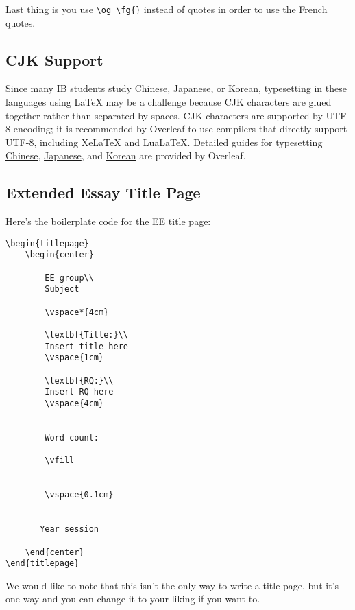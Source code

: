Last thing is you use \verb|\og \fg{}| instead of quotes in order to use the French quotes.
\subsection{CJK Support}
Since many IB students study Chinese, Japanese, or Korean, typesetting in these languages using \LaTeX{} may be a challenge because CJK characters are glued together rather than separated by spaces. CJK characters are supported by UTF-8 encoding; it is recommended by Overleaf to use compilers that directly support UTF-8, including XeLaTeX and LuaLaTeX. Detailed guides for typesetting \href{https://www.overleaf.com/learn/latex/Chinese}{Chinese}, \href{https://www.overleaf.com/learn/latex/Japanese}{Japanese}, and \href{https://www.overleaf.com/learn/latex/Korean}{Korean} are provided by Overleaf.
\subsection{Extended Essay Title Page}
Here's the boilerplate code for the EE title page:
\begin{verbatim}
\begin{titlepage}
    \begin{center}
        
        EE group\\
        Subject
        
        \vspace*{4cm}
 
        \textbf{Title:}\\
        Insert title here
        \vspace{1cm}

        \textbf{RQ:}\\
        Insert RQ here
        \vspace{4cm}


        Word count:
 
        \vfill
 
 
        \vspace{0.1cm}
 
 
       Year session
 
    \end{center}
\end{titlepage}
\end{verbatim}
We would like to note that this isn't the only way to write a title page,
but it's one way and you can change it to your liking if you want to.
